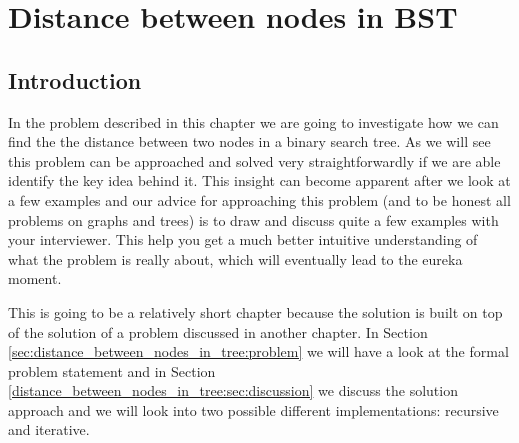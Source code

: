 %

\chapter{Distance between nodes in BST}
\label{ch:distance_between_nodes_in_tree}
\section*{Introduction}

In the problem described in this chapter  we are going to investigate how we can find the the distance between two nodes in a binary search tree. 
As we will see this problem can be approached and solved very straightforwardly 
if we are able identify the key idea behind it. This insight can become apparent after we look at a few examples and our advice for approaching this problem (and to be honest all problems on graphs and trees)
is to draw and discuss quite a few examples with your interviewer. This help you get a much better intuitive understanding of 
what the problem is really about, which will eventually lead to the eureka moment.

This is going to be a relatively short chapter because the solution is built on top of the solution of a problem discussed in another chapter. 
In Section \ref{sec:distance_between_nodes_in_tree:problem} we will have a look at the formal problem statement 
and in Section \ref{distance_between_nodes_in_tree:sec:discussion} we discuss the solution approach and we will look into two possible different implementations: recursive and iterative. 

